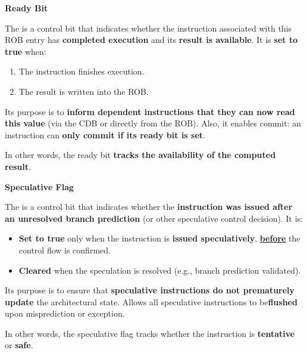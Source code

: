 \highspace
\begin{flushleft}
    \textcolor{Green3}{ \textbf{Ready Bit}}
\end{flushleft}
The  is a control bit that indicates whether the instruction associated with this ROB entry has \textbf{completed execution} and its \textbf{result is available}. It is \textbf{set to true} when:
\begin{enumerate}
    \item The instruction finishes execution.
    \item The result is written into the ROB.
\end{enumerate}
Its purpose is to \textbf{inform dependent instructions that they can now read this value} (via the CDB or directly from the ROB). Also, it enables commit: an instruction can \textbf{only commit if its ready bit is set}.

\highspace
In other words, the ready bit \textbf{tracks the availability of the computed result}.

\highspace
\begin{flushleft}
    \textcolor{Green3}{ \textbf{Speculative Flag}}
\end{flushleft}
The  is a control bit that indicates whether the \textbf{instruction was issued after an unresolved branch prediction} (or other speculative control decision). It is:
\begin{itemize}
    \item[\textcolor{Green3}{\faIcon{toggle-on}}] \textbf{Set to true} only when the instruction is \textbf{issued speculatively}, \textbf{\underline{before}} the control flow is confirmed.
    \item[\textcolor{Red2}{\faIcon{toggle-off}}] \textbf{Cleared} when the speculation is resolved (e.g., branch prediction validated).
\end{itemize}
Its purpose is to ensure that \textbf{speculative instructions do not prematurely update} the architectural state. Allows all speculative instructions to be\break \textbf{flushed} upon misprediction or exception.

\highspace
In other words, the speculative flag tracks whether the instruction is \textbf{tentative} or \textbf{safe}.

\newpage

